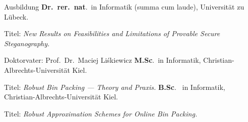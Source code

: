 \begin{rubric}{Ausbildung}
  \entry*[2012 -- 2018]%
  \textbf{Dr.~rer.~nat}.~in Informatik (summa cum laude), Universität zu Lübeck.
  \par Titel: \emph{New Results on Feasibilities and Limitations of Provable Secure Steganography.}
  \par Doktorvater: Prof.~Dr.~Maciej Liśkiewicz
  \entry*[2010 -- 2012]%
  \textbf{M.Sc}.~in Informatik, Christian-Albrechts-Universität Kiel.
  \par Titel: \emph{Robust Bin Packing --- Theory and Praxis.}
  \entry*[2007 -- 2010]%
  \textbf{B.Sc}.~ in Informatik, Christian-Albrechts-Universität Kiel.
  \par Titel: \emph{Robust Approximation Schemes for Online Bin Packing.}



\end{rubric}